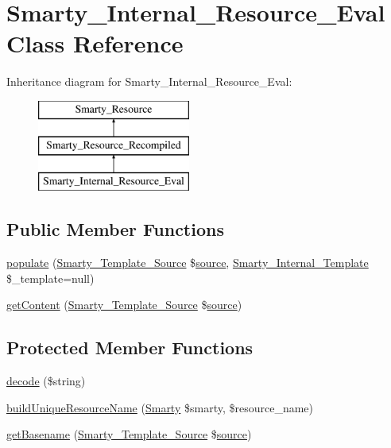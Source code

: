 \hypertarget{class_smarty___internal___resource___eval}{}\section{Smarty\+\_\+\+Internal\+\_\+\+Resource\+\_\+\+Eval Class Reference}
\label{class_smarty___internal___resource___eval}
Inheritance diagram for Smarty\+\_\+\+Internal\+\_\+\+Resource\+\_\+\+Eval\+:\begin{figure}[H]
\begin{center}
\leavevmode
\includegraphics[height=3.000000cm]{class_smarty___internal___resource___eval}
\end{center}
\end{figure}
\subsection*{Public Member Functions}
\begin{DoxyCompactItemize}
\item 
\hyperlink{class_smarty___internal___resource___eval_a07a771f460d625d63fcb72d0aeed0b01}{populate} (\hyperlink{class_smarty___template___source}{Smarty\+\_\+\+Template\+\_\+\+Source} \$\hyperlink{class_smarty___resource_ab6ac6b66dac2da6c41a178102f7d53e4}{source}, \hyperlink{class_smarty___internal___template}{Smarty\+\_\+\+Internal\+\_\+\+Template} \$\+\_\+template=null)
\item 
\hyperlink{class_smarty___internal___resource___eval_a0e40116a3d4f59cf7ea39f83441169b8}{get\+Content} (\hyperlink{class_smarty___template___source}{Smarty\+\_\+\+Template\+\_\+\+Source} \$\hyperlink{class_smarty___resource_ab6ac6b66dac2da6c41a178102f7d53e4}{source})
\end{DoxyCompactItemize}
\subsection*{Protected Member Functions}
\begin{DoxyCompactItemize}
\item 
\hyperlink{class_smarty___internal___resource___eval_a9fb211ee74fee3ad085661da46aa220f}{decode} (\$string)
\item 
\hyperlink{class_smarty___internal___resource___eval_acadaf10ca33c215a82372c1144f0fe4a}{build\+Unique\+Resource\+Name} (\hyperlink{class_smarty}{Smarty} \$smarty, \$resource\+\_\+name)
\item 
\hyperlink{class_smarty___internal___resource___eval_a91cdf7da12bdc51906539506dd26159b}{get\+Basename} (\hyperlink{class_smarty___template___source}{Smarty\+\_\+\+Template\+\_\+\+Source} \$\hyperlink{class_smarty___resource_ab6ac6b66dac2da6c41a178102f7d53e4}{source})
\end{DoxyCompactItemize}
